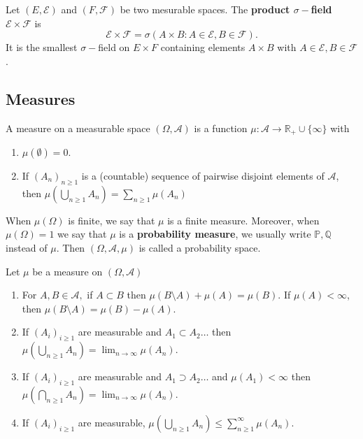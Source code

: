 \documentclass{scrartcl}
\begin{document}
  \begin{definition}
    Let $(E, \mathcal{E})$ and $(F, \mathcal{F})$ be two mesurable spaces. The \textbf{product
    $\sigma-$field} $\mathcal{E} \times \mathcal{F}$ is 
    \[
      \mathcal{E} \times \mathcal{F} = \sigma(A \times B \colon A \in \mathcal{E}, B \in
      \mathcal{F})
    .\] 
    It is the smallest $\sigma-$field on $E \times F$ containing elements $A \times B$ with $A
    \in \mathcal{E}, B \in \mathcal{F}$.
  \end{definition}

  \subsection{Measures}
  \begin{definition}
      A measure on a measurable space $(\Omega, \mathcal{A})$ is a function $\mu
      \colon \mathcal{A} \to \mathbb{R}_+ \cup \{ \infty \} $ with 
      \begin{enumerate}
        \item $\mu(\emptyset) = 0$.
        \item If $(A_n)_{n \geq 1}$ is a (countable) sequence of pairwise disjoint elements of
          $\mathcal{A}$, then $\mu\left(\bigcup_{n \geq 1} A_n\right) = \sum_{n \geq 1} \mu(A_n)$
      \end{enumerate}
  \end{definition}

  When $\mu(\Omega)$ is finite, we say that $\mu$ is a finite measure. Moreover, when
  $\mu(\Omega) = 1$ we say that $\mu$ is a \textbf{probability measure}, we usually write
  $\mathbb{P}, \mathbb{Q}$ instead of $\mu$. Then $(\Omega, \mathcal{A}, \mu)$ is called a
  probability space.

  \begin{proposition}
      Let $\mu$ be a measure on $(\Omega, \mathcal{A})$
      \begin{enumerate}
        \item For $A, B \in \mathcal{A}, $ if $A \subset B$ then $\mu(B \setminus A) + \mu(A) =
        \mu(B)$. If $\mu(A) < \infty$, then $\mu(B \setminus A) = \mu(B) - \mu(A)$.
        \item If $(A_i)_{i \geq 1}$ are measurable and $A_1 \subset A_2 \ldots$ then $\mu
        (\bigcup_{n \geq 1} A_n) = \lim_{n \to \infty} \mu(A_n)$.
        \item If $(A_i)_{i \geq 1}$ are measurable and $A_1 \supset A_2 \ldots$ and $\mu(A_1)
          < \infty$ then $\mu(\bigcap_{n \geq 1} A_n) = \lim_{n \to \infty} \mu(A_n)$.
        \item If $(A_i)_{i \geq 1}$ are measurable, $\mu(\bigcup_{n \geq 1} A_n) \leq \sum_{n
          \geq 1}^\infty \mu(A_n)$.
      \end{enumerate}
  \end{proposition}
\end{document}
